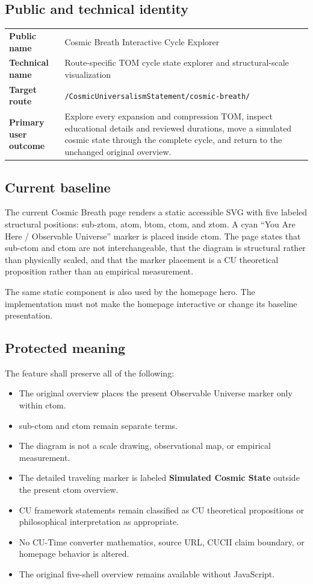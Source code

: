 \documentclass[11pt,letterpaper]{article}
\newcommand{\TargetRoute}{/CosmicUniversalismStatement/cosmic-breath/}
\newcommand{\filepath}[1]{\nolinkurl{#1}}
\newcommand{\term}[1]{\textbf{\textsf{#1}}}
\begin{document}
\subsection{Public and technical identity}
\begin{tabularx}{\textwidth}{>{\bfseries}L{2.1in}Y}
Public name & Cosmic Breath Interactive Cycle Explorer \\
Technical name & Route-specific TOM cycle state explorer and structural-scale visualization \\
Target route & \filepath{\TargetRoute} \\
Primary user outcome & Explore every expansion and compression TOM, inspect educational details and reviewed durations, move a simulated cosmic state through the complete cycle, and return to the unchanged original overview. \\
\end{tabularx}

\subsection{Current baseline}
The current Cosmic Breath page renders a static accessible SVG with five labeled structural positions: sub-ztom, atom, btom, ctom, and ztom. A cyan ``You Are Here / Observable Universe'' marker is placed inside ctom. The page states that sub-ctom and ctom are not interchangeable, that the diagram is structural rather than physically scaled, and that the marker placement is a CU theoretical proposition rather than an empirical measurement.

The same static component is also used by the homepage hero. The implementation must not make the homepage interactive or change its baseline presentation.

\subsection{Protected meaning}
The feature shall preserve all of the following:
\begin{itemize}
\item The original overview places the present Observable Universe marker only within ctom.
\item sub-ctom and ctom remain separate terms.
\item The diagram is not a scale drawing, observational map, or empirical measurement.
\item The detailed traveling marker is labeled \term{Simulated Cosmic State} outside the present ctom overview.
\item CU framework statements remain classified as CU theoretical propositions or philosophical interpretation as appropriate.
\item No CU-Time converter mathematics, source URL, CUCII claim boundary, or homepage behavior is altered.
\item The original five-shell overview remains available without JavaScript.
\end{itemize}
\end{document}
